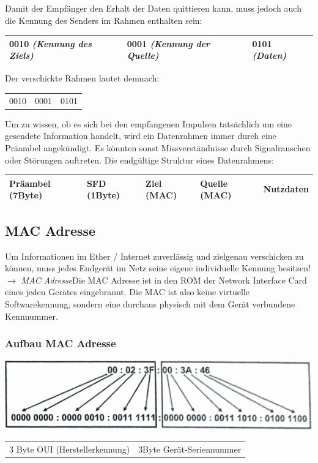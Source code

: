 \documentclass[12pt,a4paper]{article}
\begin{document}
    Damit der Empfänger den Erhalt der Daten quittieren kann, muss jedoch auch die Kennung des Senders im Rahmen enthalten sein:
	\begin{center}
		\begin{tabularx}{17cm}{|X|X|X|}
			\hline
			0010 \textit{(Kennung des Ziels)}&0001 \textit{(Kennung der Quelle)}&0101 \textit{(Daten)}\\
			\hline
		\end{tabularx}
	\end{center}
    Der verschickte Rahmen lautet demnach:
	\begin{center}
		\begin{tabularx}{5cm}{XXX}
			0010&0001&0101\\
		\end{tabularx}
	\end{center}
    Um zu wissen, ob es sich bei den empfangenen Impulsen tatsächlich um eine gesendete Information handelt, wird ein Datenrahmen immer durch eine Präambel angekündigt. Es könnten sonst Missverständnisse durch Signalrauschen oder Störungen auftreten. Die endgültige Struktur eines Datenrahmens:
	\begin{center}
		\begin{tabularx}{17cm}{|l|l|X|X|X|}
			\hline
			Präambel (7Byte)&SFD (1Byte)&Ziel (MAC)&Quelle (MAC)&Nutzdaten\\
			\hline
		\end{tabularx}
	\end{center}

\subsection{MAC Adresse}
    Um Informationen im Ether / Internet zuverlässig und zielgenau verschicken zu können, muss jedes Endgerät im Netz seine eigene individuelle Kennung besitzen!\newline $\longrightarrow$ \emph{MAC Adresse}\newline Die MAC Adresse ist in den ROM der Network Interface Card eines jeden Gerätes eingebrannt. Die MAC ist also keine virtuelle Softwarekennung, sondern eine durchaus physisch mit dem Gerät verbundene Kennnummer.

\subsubsection{Aufbau MAC Adresse}
    \begin{center}
        \includegraphics[scale=1]{Bilder/MAC.png}
        \begin{tabularx}{14cm}{XX}
            3 Byte OUI (Herstellerkennung)&3Byte Gerät-Seriennummer
        \end{tabularx}
    \end{center}
   
\end{document}
